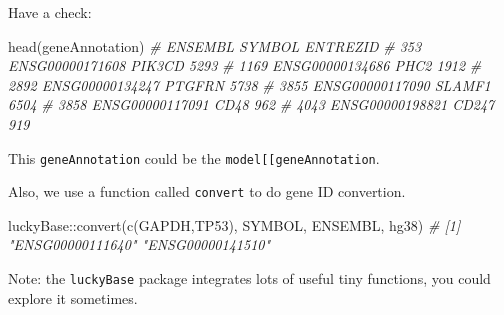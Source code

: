 \documentclass[
  12pt,
]{book}
\newenvironment{Shaded}{\begin{snugshade}}{\end{snugshade}}
\newcommand{\CommentTok}[1]{\textcolor[rgb]{0.56,0.35,0.01}{\textit{#1}}}
\newcommand{\FunctionTok}[1]{\textcolor[rgb]{0.00,0.00,0.00}{#1}}
\newcommand{\NormalTok}[1]{#1}
\newcommand{\SpecialCharTok}[1]{\textcolor[rgb]{0.00,0.00,0.00}{#1}}
\newcommand{\StringTok}[1]{\textcolor[rgb]{0.31,0.60,0.02}{#1}}
\begin{document}
Have a check:

\begin{Shaded}
\begin{Highlighting}[]
\FunctionTok{head}\NormalTok{(geneAnnotation)}
\CommentTok{\#              ENSEMBL SYMBOL ENTREZID}
\CommentTok{\# 353  ENSG00000171608 PIK3CD     5293}
\CommentTok{\# 1169 ENSG00000134686   PHC2     1912}
\CommentTok{\# 2892 ENSG00000134247 PTGFRN     5738}
\CommentTok{\# 3855 ENSG00000117090 SLAMF1     6504}
\CommentTok{\# 3858 ENSG00000117091   CD48      962}
\CommentTok{\# 4043 ENSG00000198821  CD247      919}
\end{Highlighting}
\end{Shaded}

This \texttt{geneAnnotation} could be the \texttt{model{[}{[}\textquotesingle{}geneAnnotation\textquotesingle{}{]}{]}}.

Also, we use a function called \texttt{convert} to do gene ID convertion.

\begin{Shaded}
\begin{Highlighting}[]
\NormalTok{luckyBase}\SpecialCharTok{::}\FunctionTok{convert}\NormalTok{(}\FunctionTok{c}\NormalTok{(}\StringTok{\textquotesingle{}GAPDH\textquotesingle{}}\NormalTok{,}\StringTok{\textquotesingle{}TP53\textquotesingle{}}\NormalTok{), }\StringTok{\textquotesingle{}SYMBOL\textquotesingle{}}\NormalTok{, }\StringTok{\textquotesingle{}ENSEMBL\textquotesingle{}}\NormalTok{, hg38)}
\CommentTok{\# [1] "ENSG00000111640" "ENSG00000141510"}
\end{Highlighting}
\end{Shaded}

Note: the \texttt{luckyBase} package integrates lots of useful tiny functions, you could explore it sometimes.

  
\end{document}
